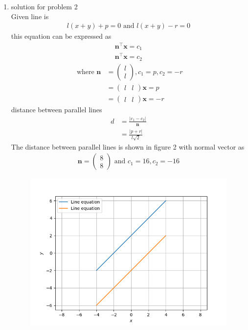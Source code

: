 \documentclass[12pt]{article}
\providecommand{\abs}[1]{\left\vert#1\right\vert}
\newcommand{\myvec}[1]{\ensuremath{\begin{pmatrix}#1\end{pmatrix}}}
\let\vec\mathbf
\begin{document}
\begin{enumerate}
\begin{figure}[h!]
\begin{center}
\end{center}
\caption{}
\label{fig:Fig1}
\end{figure}
	\item solution for problem 2
	\\
Given line is 
\begin{align}
l(x+y)+p=0\text{ and }l(x+y)-r=0
\end{align}
this equation can be expressed as 
\begin{align}
\vec{n}^{\top}\vec{x}=c_1\\
\vec{n}^{\top}\vec{x}=c_2
\end{align}
\begin{align}
\text{ where }
\vec{n}& = \myvec{l\\l},c_1=p,c_2=-r\\
& =\myvec{l&l}\vec{x}=p\\ 
& =\myvec{l&l}\vec{x}=-r		
\end{align}
distance between parallel lines 
\begin{align}
d&=\frac{\abs{c_1-c_2}}{\vec{n}}\\
&=\frac{\abs{p+r}}{l\sqrt{2}}
\end{align}	
The distance between parallel lines 
is shown in figure 2  with normal vector as 
\begin{align*}
\vec{n} =\myvec{8\\8} \text{ and }c_1=16,c_2=-16
\end{align*}
\begin{figure}[h!]
\begin{center}
\includegraphics[width=\columnwidth]{para1.png}
\end{center}
\caption{}
\label{fig:Fig2}
\end{figure}
\end{enumerate}
\end{document}
